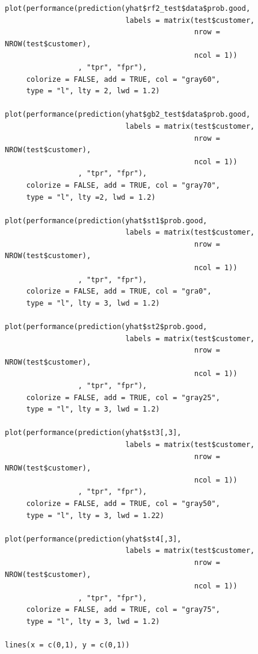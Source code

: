 \documentclass[12pt]{article}
\begin{document}
\begin{lstlisting}
plot(performance(prediction(yhat$rf2_test$data$prob.good, 
                            labels = matrix(test$customer, 
                                            nrow = NROW(test$customer), 
                                            ncol = 1))
                 , "tpr", "fpr"),
     colorize = FALSE, add = TRUE, col = "gray60", 
     type = "l", lty = 2, lwd = 1.2)

plot(performance(prediction(yhat$gb2_test$data$prob.good, 
                            labels = matrix(test$customer, 
                                            nrow = NROW(test$customer), 
                                            ncol = 1))
                 , "tpr", "fpr"),
     colorize = FALSE, add = TRUE, col = "gray70", 
     type = "l", lty =2, lwd = 1.2)

plot(performance(prediction(yhat$st1$prob.good, 
                            labels = matrix(test$customer, 
                                            nrow = NROW(test$customer), 
                                            ncol = 1))
                 , "tpr", "fpr"),
     colorize = FALSE, add = TRUE, col = "gra0", 
     type = "l", lty = 3, lwd = 1.2)

plot(performance(prediction(yhat$st2$prob.good, 
                            labels = matrix(test$customer, 
                                            nrow = NROW(test$customer), 
                                            ncol = 1))
                 , "tpr", "fpr"),
     colorize = FALSE, add = TRUE, col = "gray25",
     type = "l", lty = 3, lwd = 1.2)

plot(performance(prediction(yhat$st3[,3], 
                            labels = matrix(test$customer, 
                                            nrow = NROW(test$customer), 
                                            ncol = 1))
                 , "tpr", "fpr"),
     colorize = FALSE, add = TRUE, col = "gray50", 
     type = "l", lty = 3, lwd = 1.22)

plot(performance(prediction(yhat$st4[,3], 
                            labels = matrix(test$customer, 
                                            nrow = NROW(test$customer), 
                                            ncol = 1))
                 , "tpr", "fpr"),
     colorize = FALSE, add = TRUE, col = "gray75", 
     type = "l", lty = 3, lwd = 1.2)

lines(x = c(0,1), y = c(0,1))


\end{lstlisting}
\end{document}
